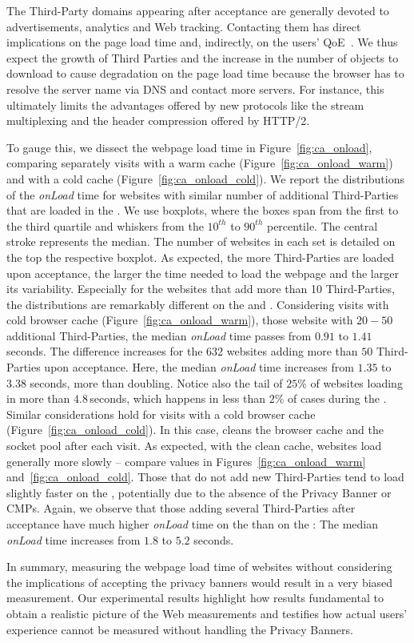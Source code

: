 The Third-Party domains appearing after acceptance are generally devoted to advertisements, analytics and Web tracking. %
Contacting them has direct implications on the page load time and, indirectly, on the users' QoE~\cite{da2018narrowing}. We thus expect the growth of Third Parties and the increase in the number of objects to download to cause degradation on the page load time because the browser has to resolve the server name via DNS and contact more servers. For instance, this ultimately limits the advantages offered by new protocols like the stream multiplexing and the header compression offered by HTTP/2.

To gauge this, we dissect the webpage load time in Figure~\ref{fig:ca_onload}, comparing separately visits with a warm cache (Figure~\ref{fig:ca_onload_warm}) and with a cold cache (Figure~\ref{fig:ca_onload_cold}). We report the distributions of the \textit{onLoad} time for websites with similar number of additional Third-Parties that are loaded in the \AFTER. We use boxplots, where the boxes span from the first to the third quartile and whiskers from the $10^{th}$ to $90^{th}$ percentile. The central stroke represents the median. The number of websites in each set is detailed on the top the respective boxplot. As expected, the more Third-Parties are loaded upon acceptance, the larger the time needed to load the webpage and the larger its variability. Especially for the websites that add more than 10 Third-Parties, the distributions are remarkably different on the \BEFORE and \AFTER. Considering visits with cold browser cache (Figure~\ref{fig:ca_onload_warm}), those website with $20-50$ additional Third-Parties, the median \textit{onLoad} time passes from $0.91$ to $1.41$ seconds. The difference increases for the $632$ websites adding more than $50$ Third-Parties upon acceptance. Here, the median \textit{onLoad} time increases from $1.35$ to $3.38$ seconds, more than doubling.
Notice also the tail of $25\%$ of websites loading in more than $4.8$\,seconds, which happens in less than $2\%$ of cases during the \BEFORE. Similar considerations hold for visits with a cold browser cache (Figure~\ref{fig:ca_onload_cold}). In this case, \TOOL cleans the browser cache and the socket pool after each visit. As expected, with the clean cache, websites load generally more slowly -- compare values in Figures~\ref{fig:ca_onload_warm} and~\ref{fig:ca_onload_cold}. Those that do not add new Third-Parties tend to load slightly faster on the \AFTER, potentially due to the absence of the Privacy Banner or CMPs. Again, we observe that those adding several Third-Parties after acceptance have much higher \textit{onLoad} time on the \AFTER than on the \BEFORE:  The median \textit{onLoad} time increases from $1.8$ to $5.2$ seconds.

In summary, measuring the webpage load time of websites without considering the implications of accepting the privacy banners would result in a very biased measurement. Our experimental results highlight how \TOOL results fundamental to obtain a realistic picture of the Web measurements and testifies how actual users' experience cannot be measured without handling the Privacy Banners.

